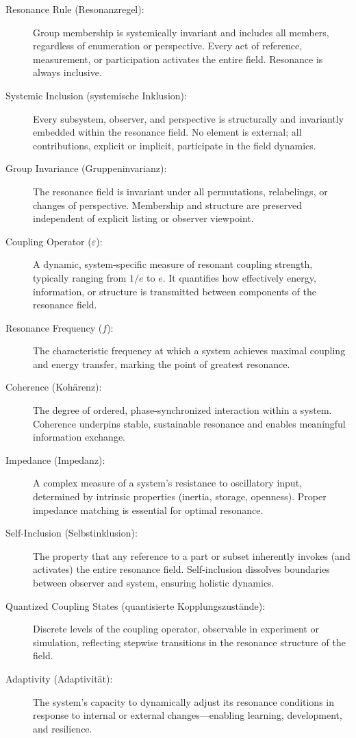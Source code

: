 \documentclass[12pt]{article}
\begin{document}
	\begin{description}
		
		\item[Resonance Rule (Resonanzregel):]  
		Group membership is systemically invariant and includes all members, regardless of enumeration or perspective. Every act of reference, measurement, or participation activates the entire field. Resonance is always inclusive.
		
		\item[Systemic Inclusion (systemische Inklusion):]  
		Every subsystem, observer, and perspective is structurally and invariantly embedded within the resonance field. No element is external; all contributions, explicit or implicit, participate in the field dynamics.
		
		\item[Group Invariance (Gruppeninvarianz):]  
		The resonance field is invariant under all permutations, relabelings, or changes of perspective. Membership and structure are preserved independent of explicit listing or observer viewpoint.
		
		\item[Coupling Operator ($\varepsilon$):]  
		A dynamic, system-specific measure of resonant coupling strength, typically ranging from $1/e$ to $e$. It quantifies how effectively energy, information, or structure is transmitted between components of the resonance field.
		
		\item[Resonance Frequency ($f$):]  
		The characteristic frequency at which a system achieves maximal coupling and energy transfer, marking the point of greatest resonance.
		
		\item[Coherence (Kohärenz):]  
		The degree of ordered, phase-synchronized interaction within a system. Coherence underpins stable, sustainable resonance and enables meaningful information exchange.
		
		\item[Impedance (Impedanz):]  
		A complex measure of a system’s resistance to oscillatory input, determined by intrinsic properties (inertia, storage, openness). Proper impedance matching is essential for optimal resonance.
		
		\item[Self-Inclusion (Selbstinklusion):]  
		The property that any reference to a part or subset inherently invokes (and activates) the entire resonance field. Self-inclusion dissolves boundaries between observer and system, ensuring holistic dynamics.
		
		\item[Quantized Coupling States (quantisierte Kopplungszustände):]  
		Discrete levels of the coupling operator, observable in experiment or simulation, reflecting stepwise transitions in the resonance structure of the field.
		
		\item[Adaptivity (Adaptivität):]  
		The system’s capacity to dynamically adjust its resonance conditions in response to internal or external changes—enabling learning, development, and resilience.
		
	\end{description}
	
\end{document}
